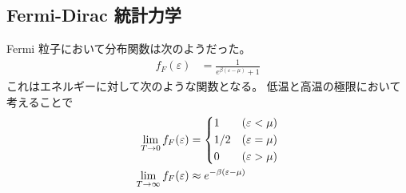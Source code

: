 \documentclass[uplatex,diffipdfmx,a4paper,11pt]{jlreq}
\numberwithin{equation}{section}
\theoremstyle{definition}
\begin{document}
\subsection{Fermi-Dirac 統計力学}
Fermi 粒子において分布関数は次のようだった。
\begin{align}
  f_F(\varepsilon) & = \frac{1}{e^{\beta(\varepsilon - \mu)} + 1}
\end{align}
これはエネルギーに対して次のような関数となる。
低温と高温の極限において考えることで
\begin{align}
  \lim_{T\to 0}f_F(\varepsilon)      & = \begin{dcases}
                                           1   & (\varepsilon < \mu) \\
                                           1/2 & (\varepsilon = \mu) \\
                                           0   & (\varepsilon > \mu)
                                         \end{dcases}           \\
  \lim_{T\to \infty}f_F(\varepsilon) & \approx e^{-\beta(\varepsilon - \mu)}
\end{align}
\end{document}
